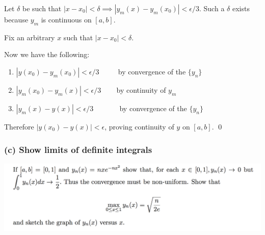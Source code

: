 \documentclass[12pt]{article}
\begin{document}
\begin{mdframed}
  Let $\delta$ be such that
  $|x - x_0| < \delta \implies |y_m(x) - y_m(x_0)| < \epsilon/3$. Such a
  $\delta$ exists because $y_m$ is continuous on $[a,b]$.

  Fix an arbitrary $x$ such that $|x - x_0| < \delta$.

  Now we have the following:
  \begin{enumerate}
  \item $|y(x_0) - y_m(x_0)| < \epsilon/3$ ~~~~ by convergence of the $\{y_n\}$
  \item $|y_m(x_0) - y_m(x)| < \epsilon/3$ ~~~ by continuity of $y_m$
  \item $|y_m(x) - y(x)| < \epsilon/3$    ~~~~~~ by convergence of the $\{y_n\}$
  \end{enumerate}
  Therefore $|y(x_0) - y(x)| < \epsilon$, proving continuity of $y$ on $[a,b]$. \qed


  \subsubsection*{(c) Show limits of definite integrals }


\end{mdframed}

\newpage
\includegraphics[width=450pt]{img/differential-equations-a1-1-1-b.png}\\
\begin{mdframed}
\end{mdframed}
\end{document}
